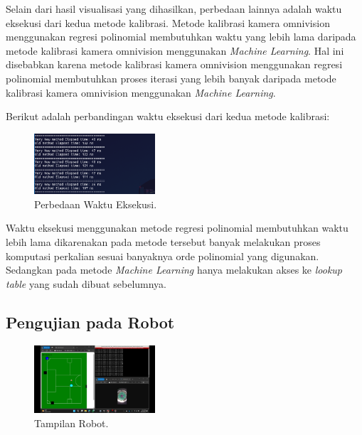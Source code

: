 Selain dari hasil visualisasi yang dihasilkan, perbedaan lainnya adalah waktu eksekusi dari kedua metode kalibrasi. Metode kalibrasi kamera omnivision menggunakan regresi polinomial membutuhkan waktu yang lebih lama daripada metode kalibrasi kamera omnivision menggunakan \emph{Machine Learning}. Hal ini disebabkan karena metode kalibrasi kamera omnivision menggunakan regresi polinomial membutuhkan proses iterasi yang lebih banyak daripada metode kalibrasi kamera omnivision menggunakan \emph{Machine Learning}. 

Berikut adalah perbandingan waktu eksekusi dari kedua metode kalibrasi: 

\begin{figure}
    \centering
    \includegraphics[width=0.4\textwidth]{gambar/beda_waktu.png}
  
    \caption{Perbedaan Waktu Eksekusi.}
    \label{fig:bedawaktueksekusi}
\end{figure} 

Waktu eksekusi menggunakan metode regresi polinomial membutuhkan waktu lebih lama dikarenakan pada metode tersebut banyak melakukan proses komputasi perkalian sesuai banyaknya orde polinomial yang digunakan. Sedangkan pada metode \emph{Machine Learning} hanya melakukan akses ke \emph{lookup table} yang sudah dibuat sebelumnya. 

\subsection{Pengujian pada Robot}
\label{subsec:pengujianrobot}

\begin{figure}
    \centering
    \includegraphics[width=0.4\textwidth]{gambar/saat_putar_bola.png}
  
    \caption{Tampilan Robot.}
    \label{fig:tampilanrobot}
\end{figure} 


